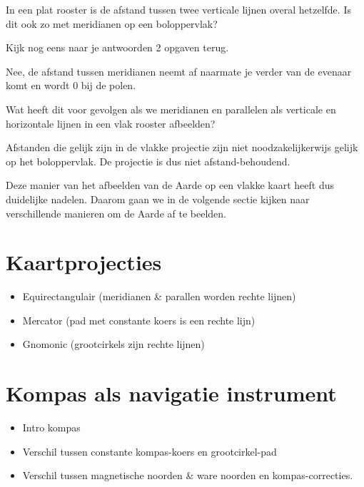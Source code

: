 \begin{opgave}[\vinger]
	\begin{subopgave}
		In een plat rooster is de afstand tussen twee verticale lijnen overal hetzelfde. Is dit ook zo met meridianen op een boloppervlak?
		\begin{hint}
			Kijk nog eens naar je antwoorden 2 opgaven terug.
		\end{hint}
		\begin{antwoord}
			Nee, de afstand tussen meridianen neemt af naarmate je verder van de evenaar komt en wordt 0 bij de polen.
		\end{antwoord}
	\end{subopgave}
	\begin{subopgave}
		 Wat heeft dit voor gevolgen als we meridianen en parallelen als verticale en horizontale lijnen in een vlak rooster afbeelden?
		\begin{antwoord}
			Afstanden die gelijk zijn in de vlakke projectie zijn niet noodzakelijkerwijs gelijk op het boloppervlak. De projectie is dus niet afstand-behoudend.
		\end{antwoord}
	\end{subopgave}
\end{opgave}

Deze manier van het afbeelden van de Aarde op een vlakke kaart heeft dus duidelijke nadelen. Daarom gaan we in de volgende sectie kijken naar verschillende manieren om de Aarde af te beelden. 

\section{Kaartprojecties}

\begin{itemize}
	\item Equirectangulair (meridianen \& parallen worden rechte lijnen)
	\item Mercator (pad met constante koers is een rechte lijn)
	\item Gnomonic (grootcirkels zijn rechte lijnen)
\end{itemize}

\section{Kompas als navigatie instrument}

\begin{itemize}
	\item Intro kompas
	\item Verschil tussen constante kompas-koers en grootcirkel-pad
	\item Verschil tussen magnetische noorden \& ware noorden en kompas-correcties.
\end{itemize}

